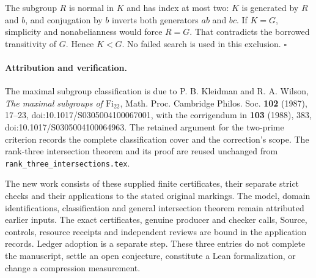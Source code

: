 \documentclass[11pt]{article}
\begin{document}
The subgroup $R$ is normal in $K$ and has index at most two: $K$ is
generated by $R$ and $b$, and conjugation by $b$ inverts both generators
$ab$ and $bc$. If $K=G$, simplicity and nonabelianness would force
$R=G$. That contradicts the borrowed transitivity of $G$. Hence $K<G$.
No failed search is used in this exclusion.
\hfill$\square$

\paragraph{Attribution and verification.}
The maximal subgroup classification is due to P. B. Kleidman and
R. A. Wilson, \emph{The maximal subgroups of $\mathrm{Fi}_{22}$},
Math. Proc. Cambridge Philos. Soc. \textbf{102} (1987), 17--23,
doi:10.1017/S0305004100067001, with the corrigendum in \textbf{103}
(1988), 383, doi:10.1017/S0305004100064963.
The retained argument for the two-prime criterion records the complete
classification cover and the correction's scope. The rank-three
intersection theorem and its proof are reused unchanged from
\texttt{rank\_three\_intersections.tex}.

The new work consists of these supplied finite certificates, their
separate strict checks and their applications to the stated original
markings. The model, domain identifications, classification and general
intersection theorem remain attributed earlier inputs. The exact
certificates, genuine producer and checker calls, Source, controls,
resource receipts and independent reviews are bound in the application
records. Ledger adoption is a separate step. These three entries do not
complete the manuscript, settle an open conjecture, constitute a Lean
formalization, or change a compression measurement.
\end{document}
